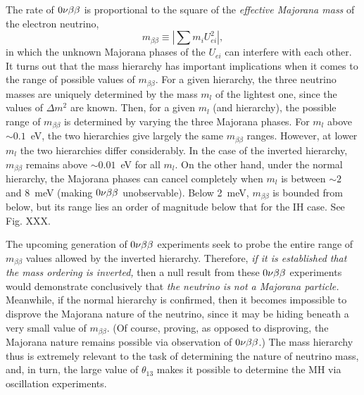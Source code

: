 \documentclass[../thesis.tex]{subfiles}
\begin{document}
The rate of $0\nu\beta\beta$ is proportional to the square of the \emph{effective
  Majorana mass} of the electron neutrino,
\begin{equation*}
  m_{\beta\beta} \equiv \left| \sum m_i U^2_{ei} \right|,
\end{equation*}
in which the unknown Majorana phases of the $U_{ei}$ can interfere with each
other. It turns out that the mass hierarchy has important implications when it
comes to the range of possible values of $m_{\beta\beta}$. For a given
hierarchy, the three neutrino masses are uniquely determined by the mass $m_l$
of the lightest one, since the values of $\Delta m^2$ are known. Then, for a
given $m_l$ (and hierarchy), the possible range of $m_{\beta\beta}$ is
determined by varying the three Majorana phases. For $m_l$ above $\sim0.1$~eV,
the two hierarchies give largely the same $m_{\beta\beta}$ ranges. However, at
lower $m_l$ the two hierarchies differ considerably. In the case of the inverted
hierarchy, $m_{\beta\beta}$ remains above $\sim0.01$~eV for all $m_l$. On the
other hand, under the normal hierarchy, the Majorana phases can cancel
completely when $m_l$ is between $\sim2$ and 8~meV (making $0\nu\beta\beta$
unobservable). Below 2~meV, $m_{\beta\beta}$ is bounded from below, but its
range lies an order of magnitude below that for the IH case. See Fig. XXX.

The upcoming generation of $0\nu\beta\beta$ experiments seek to probe the entire range of
$m_{\beta\beta}$ values allowed by the inverted hierarchy. Therefore, \emph{if
  it is established that the mass ordering is inverted,} then a null result from
these $0\nu\beta\beta$ experiments would demonstrate conclusively that \emph{the neutrino
  is not a Majorana particle.} Meanwhile, if the normal hierarchy is confirmed,
then it becomes impossible to disprove the Majorana nature of the neutrino,
since it may be hiding beneath a very small value of $m_{\beta\beta}$. (Of
course, proving, as opposed to disproving, the Majorana nature remains possible
via observation of $0\nu\beta\beta$.) The mass hierarchy thus is extremely relevant to
the task of determining the nature of neutrino mass, and, in turn, the large
value of $\theta_{13}$ makes it possible to determine the MH via oscillation
experiments.
\end{document}
